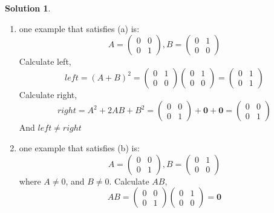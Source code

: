\documentclass[]{book}
\theoremstyle{definition}
\newtheorem*{soln}{Solution}
\begin{document}
\begin{enumerate}
\begin{soln}
	\begin{enumerate}
		\item one example that satisfies (a) is:
		$$A=\left({\begin{matrix}
			0 & 0 \\ 
			0 & 1
			\end{matrix} }\right), 
		B = \left({\begin{matrix}
			0 & 1 \\ 
			0 & 0
			\end{matrix} }\right)$$
		Calculate left,
		$$left = (A+B)^2 = \left({\begin{matrix}
			0 & 1 \\ 
			0 & 0
			\end{matrix} }\right) \left({\begin{matrix}
			0 & 1 \\ 
			0 & 0
			\end{matrix} }\right) = \left({\begin{matrix}
			0 & 1 \\ 
			0 & 1
			\end{matrix} }\right)$$
		Calculate right,
		$$right = A^2 + 2AB + B^2 = \left({\begin{matrix}
			0 & 0 \\ 
			0 & 1
			\end{matrix} }\right) + \boldsymbol{0} + \boldsymbol{0} = \left({\begin{matrix}
			0 & 0 \\ 
			0 & 1
			\end{matrix} }\right)$$
		And $left \neq right$
		
		\item 	one example that satisfies (b) is:
		$$A=\left({\begin{matrix}
			0 & 0 \\ 
			0 & 1
			\end{matrix} }\right), 
		B = \left({\begin{matrix}
			0 & 1 \\ 
			0 & 0
			\end{matrix} }\right)$$
		where $A\neq 0$, and $B \neq 0$. Calculate $AB$,
		$$AB = \left({\begin{matrix}
			0 & 0 \\ 
			0 & 1
			\end{matrix} }\right) \left({\begin{matrix}
			0 & 1 \\ 
			0 & 0
			\end{matrix} }\right) = \boldsymbol{0} $$		
	\end{enumerate}
\end{soln}


\end{enumerate}
\end{document}
